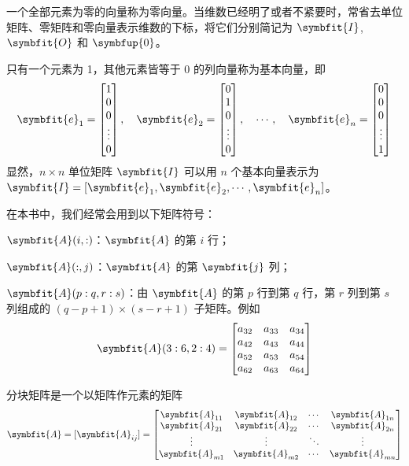 \documentclass[punct=kaiming, fontset=sikou]{ctexbook}
\numberwithin{equation}{section}
\def\bf#1{\symbfit{#1}}
\def\bup#1{\symbfup{#1}}
\begin{document}
  一个全部元素为零的向量称为零向量。当维数已经明了或者不紧要时，常省去单位矩阵、零矩阵和零向量表示维数的下标，将它们分别简记为 $\bf{I}$, $\bf{O}$ 和 $\bup{0}$。

  只有一个元素为 1，其他元素皆等于 0 的列向量称为基本向量，即
  \begin{equation}
    \bf{e}_1 = \begin{bmatrix}
      1 \\ 0 \\ 0 \\ \vdots \\ 0
    \end{bmatrix},\quad
    \bf{e}_2 = \begin{bmatrix}
      0 \\ 1 \\ 0 \\ \vdots \\ 0
    \end{bmatrix},\quad
    \cdots,\quad
    \bf{e}_n = \begin{bmatrix}
      0 \\ 0 \\ 0 \\ \vdots \\ 1
    \end{bmatrix}
  \end{equation}
  显然，$n\times n$ 单位矩阵 $\bf{I}$ 可以用 $n$ 个基本向量表示为 $\bf{I} = [\bf e_1, \bf e_2, \cdots, \bf e_n]$。

  在本书中，我们经常会用到以下矩阵符号：

  $\bf A(i,:)$：$\bf A$ 的第 $i$ 行；

  $\bf A(:,j)$：$\bf A$ 的第 $\bf j$ 列；

  $\bf A(p:q, r:s)$：由 $\bf A$ 的第 $p$ 行到第 $q$ 行，第 $r$ 列到第 $s$ 列组成的 $(q-\allowbreak p+\allowbreak 1)\times(s-r+1)$ 子矩阵。例如
  \[ \bf A(3:6, 2:4) = \begin{bmatrix}
    a_{32} & a_{33} & a_{34} \\
    a_{42} & a_{43} & a_{44} \\
    a_{52} & a_{53} & a_{54} \\
    a_{62} & a_{63} & a_{64}
  \end{bmatrix} \]

  分块矩阵是一个以矩阵作元素的矩阵
  \[ \bf A = [\bf A_{ij}] = \begin{bmatrix}
    \bf A_{11}  & \bf A_{12}  & \cdots  & \bf A_{1n} \\
    \bf A_{21}  & \bf A_{22}  & \cdots  & \bf A_{2n} \\
    \vdots      & \vdots      & \ddots  & \vdots \\
    \bf A_{m1}  & \bf A_{m2}  & \cdots  & \bf A_{mn}
  \end{bmatrix} \]
\end{document}

